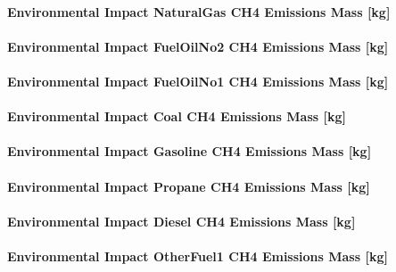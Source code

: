 \paragraph{Environmental Impact NaturalGas CH4 Emissions Mass {[}kg{]}}\label{environmental-impact-natural-gas-ch4-emissions-mass-kg}

\paragraph{Environmental Impact FuelOilNo2 CH4 Emissions Mass {[}kg{]}}\label{environmental-impact-fuel-oil-2-ch4-emissions-mass-kg}

\paragraph{Environmental Impact FuelOilNo1 CH4 Emissions Mass {[}kg{]}}\label{environmental-impact-fuel-oil-1-ch4-emissions-mass-kg}

\paragraph{Environmental Impact Coal CH4 Emissions Mass {[}kg{]}}\label{environmental-impact-coal-ch4-emissions-mass-kg}

\paragraph{Environmental Impact Gasoline CH4 Emissions Mass {[}kg{]}}\label{environmental-impact-gasoline-ch4-emissions-mass-kg}

\paragraph{Environmental Impact Propane CH4 Emissions Mass {[}kg{]}}\label{environmental-impact-propane-ch4-emissions-mass-kg}

\paragraph{Environmental Impact Diesel CH4 Emissions Mass {[}kg{]}}\label{environmental-impact-diesel-ch4-emissions-mass-kg}

\paragraph{Environmental Impact OtherFuel1 CH4 Emissions Mass {[}kg{]}}\label{environmental-impact-otherfuel1-ch4-emissions-mass-kg}

